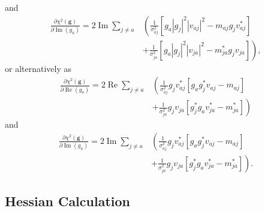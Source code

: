 \documentclass{article}
\newcommand\re{\operatorname{Re}}
\newcommand\im{\operatorname{Im}}
\begin{document}
and
\begin{equation}
\begin{split}
    \frac{\partial \chi^2(\boldsymbol{g})}{\partial \im(g_a)} = 2 \im \sum_{j \ne a} 
    & \left( \frac{1}{\sigma_{aj}^2} \left[ g_a |g_j|^2 |v_{aj}|^2 - m_{aj} g_j v_{aj}^* \right] \right. \\
    &\left. + \frac{1}{\sigma_{ja}^2} \left[ g_a |g_j|^2 |v_{ja}|^2 - m_{ja}^* g_j v_{ja} \right] \right),
\end{split}
\end{equation}
or alternatively as
\begin{equation}
\begin{split}
    \frac{\partial \chi^2(\boldsymbol{g})}{\partial \re(g_a)} = 2 \re \sum_{j \ne a} 
    & \left( \frac{1}{\sigma_{aj}^2} g_j v_{aj}^* \left[ g_a g_j^* v_{aj} - m_{aj} \right] \right. \\
    &\left. + \frac{1}{\sigma_{ja}^2} g_j v_{ja} \left[ g_j^* g_a v_{ja}^* - m_{ja}^*  \right] \right)
\end{split}
\end{equation}
and
\begin{equation}
\begin{split}
    \frac{\partial \chi^2(\boldsymbol{g})}{\partial \im(g_a)} = 2 \im \sum_{j \ne a} 
    & \left( \frac{1}{\sigma_{aj}^2} g_j v_{aj}^* \left[ g_a g_j^* v_{aj} - m_{aj} \right] \right. \\
    &\left. + \frac{1}{\sigma_{ja}^2} g_j v_{ja} \left[ g_j^* g_a v_{ja}^* - m_{ja}^*  \right] \right).
\end{split}
\end{equation}

\subsection{Hessian Calculation}
\label{s:simplest_hess}
\end{document}
